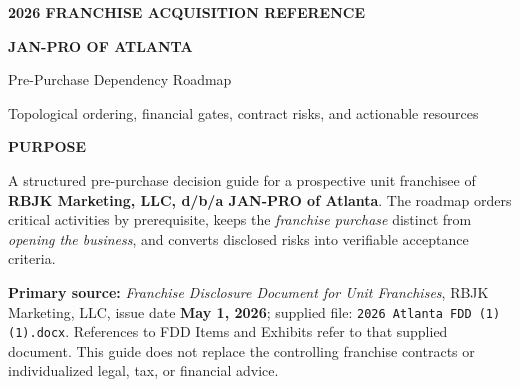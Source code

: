 \documentclass[10pt,letterpaper]{article}
\begin{document}
\thispagestyle{empty}
\vspace*{.58in}
{\sffamily\bfseries\color{white}\normalsize 2026 FRANCHISE ACQUISITION REFERENCE}\par
\vspace{.21in}
{\sffamily\bfseries\color{white}\fontsize{30}{36}\selectfont JAN-PRO OF ATLANTA}\par
\vspace{.12in}
{\sffamily\color{white}\fontsize{23}{28}\selectfont Pre-Purchase Dependency Roadmap}\par
\vspace{.17in}
{\sffamily\color{white!85}\large Topological ordering, financial gates, contract risks, and actionable resources}\par
\vspace{1.02in}
{\sffamily\bfseries\color{Navy}\large PURPOSE}\par
A structured pre-purchase decision guide for a prospective unit franchisee of
\textbf{RBJK Marketing, LLC, d/b/a JAN-PRO of Atlanta}. The roadmap orders
critical activities by prerequisite, keeps the \textit{franchise purchase} distinct
from \textit{opening the business}, and converts disclosed risks into verifiable
acceptance criteria.

\begin{noteBox}
\textbf{Primary source:} \emph{Franchise Disclosure Document for Unit Franchises},
RBJK Marketing, LLC, issue date \textbf{May 1, 2026}; supplied file:
\texttt{2026 Atlanta FDD (1)(1).docx}. References to FDD Items and Exhibits
refer to that supplied document. This guide does not replace the controlling
franchise contracts or individualized legal, tax, or financial advice.
\end{noteBox}
\end{document}

